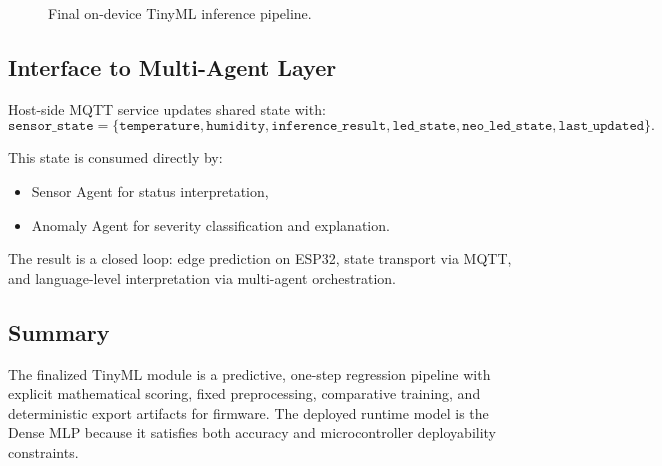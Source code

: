 \begin{figure}[H]
\centering
{}
\caption{Final on-device TinyML inference pipeline.}
\label{fig:inference-pipeline}
\end{figure}

\subsection{Interface to Multi-Agent Layer}
\label{sec:tinyml-to-mas}

Host-side MQTT service updates shared state with:
\begin{equation}
\label{eq:shared-state}
\texttt{sensor\_state} =
\{\texttt{temperature},\texttt{humidity},\texttt{inference\_result},
\texttt{led\_state},\texttt{neo\_led\_state},\texttt{last\_updated}\}.
\end{equation}

This state is consumed directly by:
\begin{itemize}
    \item Sensor Agent for status interpretation,
    \item Anomaly Agent for severity classification and explanation.
\end{itemize}

The result is a closed loop: edge prediction on ESP32, state transport
via MQTT, and language-level interpretation via multi-agent orchestration.

\subsection{Summary}
\label{sec:tinyml-summary}

The finalized TinyML module is a predictive, one-step regression
pipeline with explicit mathematical scoring, fixed preprocessing,
comparative training, and deterministic export artifacts for firmware.
The deployed runtime model is the Dense MLP because it satisfies both
accuracy and microcontroller deployability constraints.
